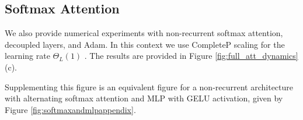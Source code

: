 \documentclass{article} %
\begin{document}
\subsection{Softmax Attention}
We also provide numerical experiments with non-recurrent softmax attention, decoupled layers, and Adam. In this context we use CompleteP scaling for the learning rate $\Theta_L(1)$ \citep{dey2025don}. The results are provided in Figure \ref{fig:full_att_dynamics} (c). 

Supplementing this figure is an equivalent figure for a non-recurrent architecture with alternating softmax attention and MLP with GELU activation, given by Figure \ref{fig:softmaxandmlpappendix}.
\end{document}
